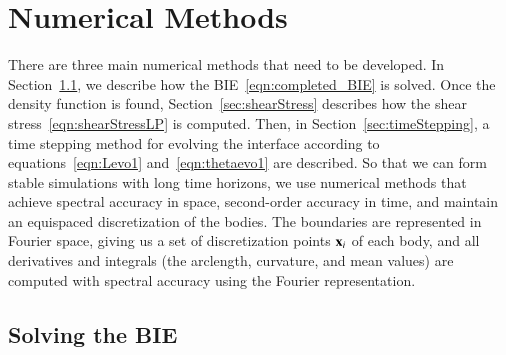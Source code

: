 \documentclass[preprint, 10pt]{elsarticle}
\begin{document}
\section{Numerical Methods}
\label{s:method}
There are three main numerical methods that need to be developed.  In
Section~\ref{sec:BIE}, we describe how the BIE~\eqref{eqn:completed_BIE}
is solved.  Once the density function is found,
Section~\ref{sec:shearStress} describes how the shear
stress~\eqref{eqn:shearStressLP} is computed.  Then, in
Section~\ref{sec:timeStepping}, a time stepping method for evolving the
interface according to equations~\eqref{eqn:Levo1}
and~\eqref{eqn:thetaevo1} are described. So that we can form stable
simulations with long time horizons, we use numerical methods that
achieve spectral accuracy in space, second-order accuracy in time, and
maintain an equispaced discretization of the bodies.  The boundaries are
represented in Fourier space, giving us a set of discretization points
${\mathbf{x}}_i$ of each body, and all derivatives and integrals (the arclength,
curvature, and mean values) are computed with spectral accuracy using
the Fourier representation.

\subsection{Solving the BIE}
\label{sec:BIE}
\end{document}
